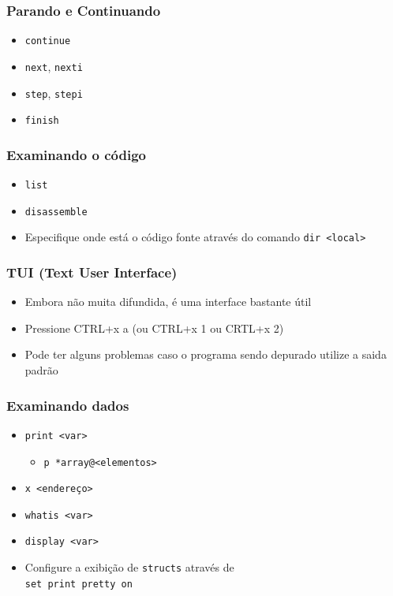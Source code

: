 \documentclass[xcolor=pdftex,dvipsnames,table,t]{beamer}
\begin{document}
\begin{frame}
	\frametitle{Parando e Continuando}
	  \begin{itemize}
	    \item \texttt{continue}
	    \item \texttt{next}, \texttt{nexti}
	    \item \texttt{step}, \texttt{stepi}
	    \item \texttt{finish}
	  \end{itemize}
\end{frame}

\begin{frame}
	\frametitle{Examinando o código}
	  \begin{itemize}
	    \item \texttt{list}
	    \item \texttt{disassemble}
	    \item Especifique onde está o código fonte através do comando \texttt{dir <local>}
	  \end{itemize}
\end{frame}

\begin{frame}
	\frametitle{TUI (Text User Interface)}
	  \begin{itemize}
	    \item Embora não muita difundida, é uma interface bastante útil
	    \item Pressione CTRL+x a (ou CTRL+x 1 ou CRTL+x 2)
	    \item Pode ter alguns problemas caso o programa sendo depurado utilize a saida padrão
	  \end{itemize}
\end{frame}

\begin{frame}
	\frametitle{Examinando dados}
	  \begin{itemize}
	    \item \texttt{print <var>}
	    \begin{itemize}
	      \item \texttt{p *array@<elementos>}
	    \end{itemize}
	    \item \texttt{x <endereço>}
	    \item \texttt{whatis <var>}
	    \item \texttt{display <var>}
	    \item Configure a exibição de \texttt{structs} através de \\
		  \texttt{set print pretty on}
	  \end{itemize}
\end{frame}
\end{document}
